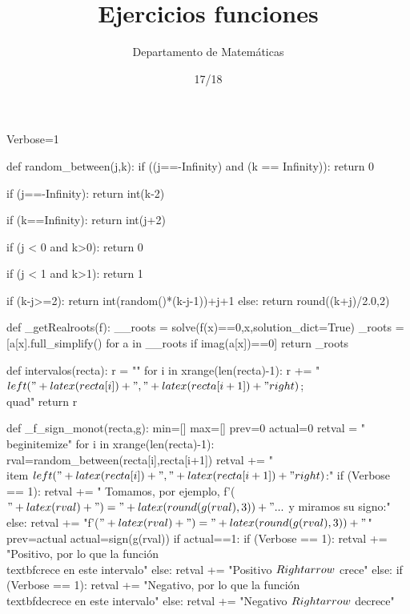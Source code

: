\documentclass[palatino,nosec]{Docencia}
\title{Ejercicios funciones}
\author{Departamento de Matemáticas}
\date{17/18}
\begin{document}
\pagestyle{plain}

\newif\ifverbose
\verbosetrue

\ifverbose
\begin{sagesilent}
	Verbose=1
\end{sagesilent}
\else
\begin{sagesilent}
	Verbose=0
\end{sagesilent}
\fi
\begin{sagesilent}
def random_between(j,k):
 if ((j==-Infinity) and (k == Infinity)):
  return 0

 if (j==-Infinity):
  return int(k-2)

 if (k==Infinity):
  return int(j+2)

 if (j < 0 and k>0):
  return 0

 if (j < 1 and k>1):
  return 1
 
 if (k-j>=2):
  return int(random()*(k-j-1))+j+1
 else:
  return round((k+j)/2.0,2)


def _getRealroots(f):
 __roots = solve(f(x)==0,x,solution_dict=True)
 _roots = [a[x].full_simplify() for a in __roots if imag(a[x])==0]
 return _roots

def intervalos(recta):
 r = ""
 for i in xrange(len(recta)-1):
  r += "$\\left("+latex(recta[i])+","+latex(recta[i+1])+"\\right)$;\\quad"  
 return r

def _f_sign_monot(recta,g):
 min=[]
 max=[]
 prev=0
 actual=0
 retval = "\\begin{itemize}"
 for i in xrange(len(recta)-1):
  rval=random_between(recta[i],recta[i+1])
  retval += "\\item $\\left("+latex(recta[i])+","+latex(recta[i+1])+"\\right)$:"
  if (Verbose == 1):
   retval += " Tomamos, por ejemplo, f'($"+latex(rval)+") = "+latex(round(g(rval),3))+"...$  y miramos su signo:" 
  else:
   retval += "f'($"+latex(rval)+") = "+latex(round(g(rval),3)) +"$"
  prev=actual
  actual=sign(g(rval))
  if actual==1: 
   if (Verbose == 1):
    retval += "Positivo, por lo que la función \\textbf{crece} en este intervalo"  
   else:
    retval += "Positivo $\\Rightarrow$ crece"
  else:
   if (Verbose == 1):
    retval += "Negativo, por lo que la función \\textbf{decrece} en este intervalo"
   else:
    retval += "Negativo $\\Rightarrow$ decrece"



\end{sagesilent}
\end{document}
